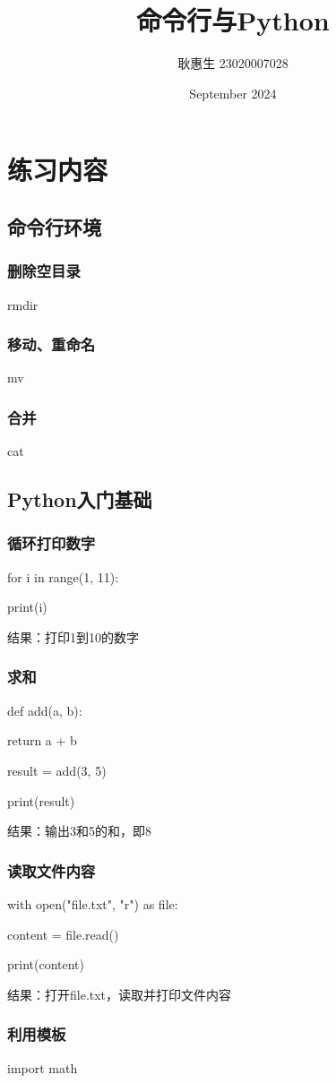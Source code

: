 \documentclass{ctexart}
\title{命令行与Python}
\author{耿惠生 23020007028}
\date{September 2024}
\begin{document}
\maketitle

\section{练习内容}
\subsection{命令行环境}
\subsubsection{删除空目录}
rmdir
\subsubsection{移动、重命名}
mv
\subsubsection{合并}
cat
\subsection{Python入门基础}
\subsubsection{循环打印数字}
for i in range(1, 11):

    print(i)

结果：打印1到10的数字
\subsubsection{求和}
def add(a, b):

return a + b

result = add(3, 5)

print(result)

结果：输出3和5的和，即8
\subsubsection{读取文件内容}
with open("file.txt", "r") as file:

content = file.read()

print(content)

结果：打开file.txt，读取并打印文件内容
\subsubsection{利用模板}
import math
\end{document}
